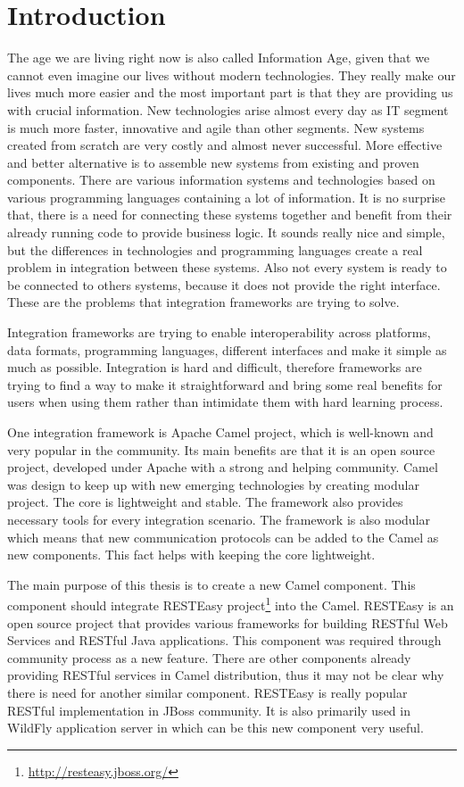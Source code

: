 \documentclass[12pt,final,oneside]{fithesis2}
\begin{document}
\chapter{Introduction}
The age we are living right now is also called Information Age, given that we cannot even imagine our lives without modern technologies. They really make our lives much more easier and the most important part is that they are providing us with crucial information. New technologies arise almost every day as IT segment is much more faster, innovative and agile than other segments. New systems created from scratch are very costly and almost never successful. More effective and better alternative is to assemble new systems from existing and proven components. There are various information systems and technologies based on various programming languages containing a lot of information. It is no surprise that, there is a need for connecting these systems together and benefit from their already running code to provide business logic. It sounds really nice and simple, but the differences in technologies and programming languages create a real problem in integration between these systems. Also not every system is ready to be connected to others systems, because it does not provide the right interface. These are the problems that integration frameworks are trying to solve.

Integration frameworks are trying to enable interoperability across platforms, data formats, programming languages, different interfaces and make it simple as much as possible. Integration is hard and difficult, therefore frameworks are trying to find a way to make it straightforward and bring some real benefits for users when using them rather than intimidate them with hard learning process.

One integration framework is Apache Camel project\cite{camel-web}, which is well-known and very popular in the community. Its main benefits are that it is an open source project, developed under Apache with a strong and helping community. Camel was design to keep up with new emerging technologies by creating modular project. The core is lightweight and stable. The framework also provides necessary tools for every integration scenario. The framework is also modular which means that new communication protocols can be added to the Camel as new components. This fact helps with keeping the core lightweight. 

The main purpose of this thesis is to create a new Camel component. This component should integrate RESTEasy project\footnote{\url{http://resteasy.jboss.org/}} into the Camel. RESTEasy is an open source project that provides various frameworks for building RESTful Web Services and RESTful Java applications. This component was required through community process as a new feature. There are other components already providing RESTful services in Camel distribution, thus it may not be clear why there is need for another similar component. RESTEasy is really popular RESTful implementation in JBoss community. It is also primarily used in WildFly application server in which can be this new component very useful.
\end{document}
